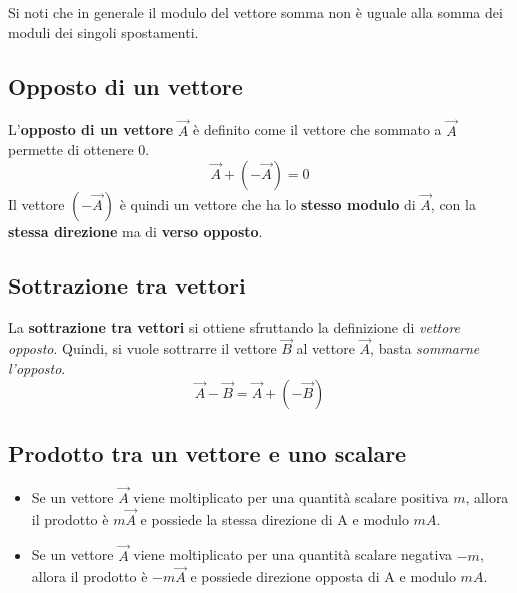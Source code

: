 \documentclass[12pt,oneside]{book}
\begin{document}
Si noti che in generale il modulo del vettore somma non è uguale alla somma dei moduli dei singoli spostamenti.

\subsection{Opposto di un vettore}
L'\textbf{opposto di un vettore} $\vec{A}$ è definito come il vettore che sommato a $\vec{A}$ permette di ottenere 0.
\begin{equation*}
    \vec{A} + (- \vec{A} ) = 0
\end{equation*}
Il vettore $(-\vec{A})$ è quindi un vettore che ha lo \textbf{stesso modulo} di $\vec{A}$, con la \textbf{stessa direzione} ma di \textbf{verso opposto}.

\subsection{Sottrazione tra vettori}
La \textbf{sottrazione tra vettori} si ottiene sfruttando la definizione di \emph{vettore opposto}.
Quindi, si vuole sottrarre il vettore $\vec{B}$ al vettore $\vec{A}$, basta \emph{sommarne l'opposto}.
\begin{equation*}
    \vec{A} - \vec{B} = \vec{A} + (- \vec{B})
\end{equation*}

\subsection{Prodotto tra un vettore e uno scalare}
\begin{itemize}
    \item Se un vettore $\vec{A}$ viene moltiplicato per una quantità scalare positiva $m$,
          allora il prodotto è $m\vec{A}$ e possiede la stessa direzione di A e modulo $mA$.
    \item Se un vettore $\vec{A}$ viene moltiplicato per una quantità scalare negativa $-m$,
          allora il prodotto è $-m\vec{A}$ e possiede direzione opposta di A e modulo $mA$.

\end{itemize}
\end{document}
